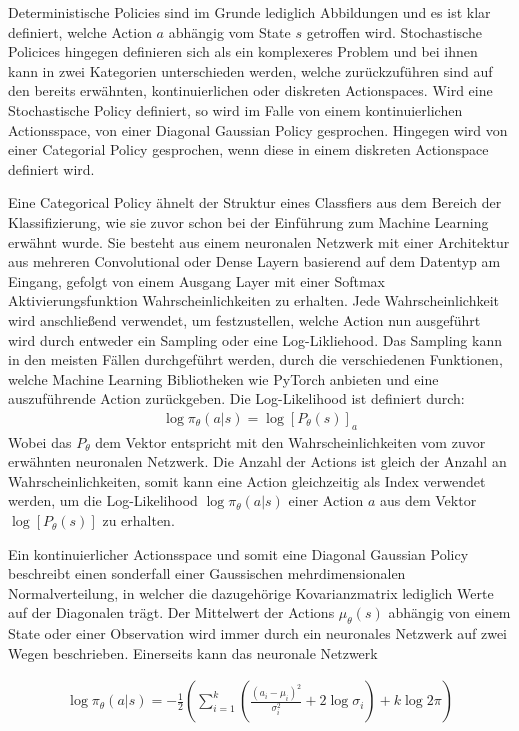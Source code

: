 \documentclass[]{iat}
\begin{document}
Deterministische Policies sind im Grunde lediglich Abbildungen und es ist klar definiert, welche Action $a$ abhängig vom State $s$ getroffen wird. Stochastische Policices hingegen definieren sich als ein komplexeres Problem und bei ihnen kann in zwei Kategorien unterschieden werden, welche zurückzuführen sind auf den bereits erwähnten, kontinuierlichen oder diskreten Actionspaces. Wird eine Stochastische Policy definiert, so wird im Falle von einem kontinuierlichen Actionsspace, von einer Diagonal Gaussian Policy gesprochen. Hingegen wird von einer Categorial Policy gesprochen, wenn diese in einem diskreten Actionspace definiert wird.

Eine Categorical Policy ähnelt der Struktur eines Classfiers aus dem Bereich der Klassifizierung, wie sie zuvor schon bei der Einführung zum Machine Learning erwähnt wurde. Sie besteht aus einem neuronalen Netzwerk mit einer Architektur aus mehreren Convolutional oder Dense Layern basierend auf dem Datentyp am Eingang, gefolgt von einem Ausgang Layer mit einer Softmax Aktivierungsfunktion Wahrscheinlichkeiten zu erhalten. Jede Wahrscheinlichkeit wird anschließend verwendet, um festzustellen, welche Action nun ausgeführt wird durch entweder ein Sampling oder eine Log-Likliehood. Das Sampling kann in den meisten Fällen durchgeführt werden, durch die verschiedenen Funktionen, welche Machine Learning Bibliotheken wie PyTorch anbieten und eine auszuführende Action zurückgeben. Die Log-Likelihood ist definiert durch:
\begin{align}
    \log \pi_\theta (a|s) = \log\left[P_\theta(s)\right]_a
\end{align}
Wobei das $P_\theta$ dem Vektor entspricht mit den Wahrscheinlichkeiten vom zuvor erwähnten neuronalen Netzwerk. Die Anzahl der Actions ist gleich der Anzahl an Wahrscheinlichkeiten, somit kann eine Action gleichzeitig als Index verwendet werden, um die Log-Likelihood $\log \pi_\theta (a|s)$ einer Action $a$ aus dem Vektor $\log\left[P_\theta(s)\right]$ zu erhalten.

Ein kontinuierlicher Actionsspace und somit eine Diagonal Gaussian Policy beschreibt einen sonderfall einer Gaussischen mehrdimensionalen Normalverteilung, in welcher die dazugehörige Kovarianzmatrix lediglich Werte auf der Diagonalen trägt. Der Mittelwert der Actions $\mu_{\theta}(s)$ abhängig von einem State oder einer Observation wird immer durch ein neuronales Netzwerk auf zwei Wegen beschrieben. Einerseits kann das neuronale Netzwerk

\begin{align}
    \log \pi_\theta (a|s) = -\frac{1}{2} \left(\sum_{i = 1}^{k} \left( \frac{(a_i-\mu_i)^2}{\sigma_i^2}+2 \log \sigma_i\right) + k \log 2 \pi \right) \label{eq:dg_log_loglikelihood}
\end{align}
\end{document}
